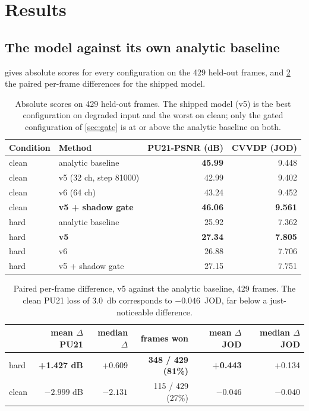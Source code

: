 \section{Results}
\label{sec:results}

\subsection{The model against its own analytic baseline}
\label{sec:headline}

 gives absolute scores for every configuration on the 429
held-out frames, and \cref{tab:paired} the paired per-frame differences for the
shipped model.

\begin{table}[htbp]
\centering
\caption{Absolute scores on 429 held-out frames. The shipped model (v5) is the
best configuration on degraded input and the worst on clean; only the gated
configuration of \cref{sec:gate} is at or above the analytic baseline on both.}
\label{tab:headline}
\begin{tabular}{llrr}
\toprule
Condition & Method & PU21-PSNR (dB) & CVVDP (JOD) \\
\midrule
clean & analytic baseline            & \textbf{45.99} & 9.448 \\
clean & v5 (32 ch, step \num{81000}) & 42.99 & 9.402 \\
clean & v6 (64 ch)                   & 43.24 & 9.452 \\
clean & \textbf{v5 + shadow gate}    & \textbf{46.06} & \textbf{9.561} \\
\midrule
hard  & analytic baseline            & 25.92 & 7.362 \\
hard  & \textbf{v5}                  & \textbf{27.34} & \textbf{7.805} \\
hard  & v6                           & 26.88 & 7.706 \\
hard  & v5 + shadow gate             & 27.15 & 7.751 \\
\bottomrule
\end{tabular}
\end{table}

\begin{table}[htbp]
\centering
\caption{Paired per-frame difference, v5 against the analytic baseline, 429
frames. The clean PU21 loss of \SI{3.0}{\decibel} corresponds to
$-0.046$~JOD, far below a just-noticeable difference.}
\label{tab:paired}
\begin{tabular}{lrrrrr}
\toprule
 & mean $\Delta$ PU21 & median $\Delta$ & frames won & mean $\Delta$ JOD & median $\Delta$ JOD \\
\midrule
hard  & \textbf{+1.427 dB} & +0.609 & \textbf{348 / 429 (81\%)} & \textbf{+0.443} & +0.134 \\
clean & $-2.999$ dB        & $-2.131$ & 115 / 429 (27\%)        & \textbf{$-0.046$} & $-0.040$ \\
\bottomrule
\end{tabular}
\end{table}

